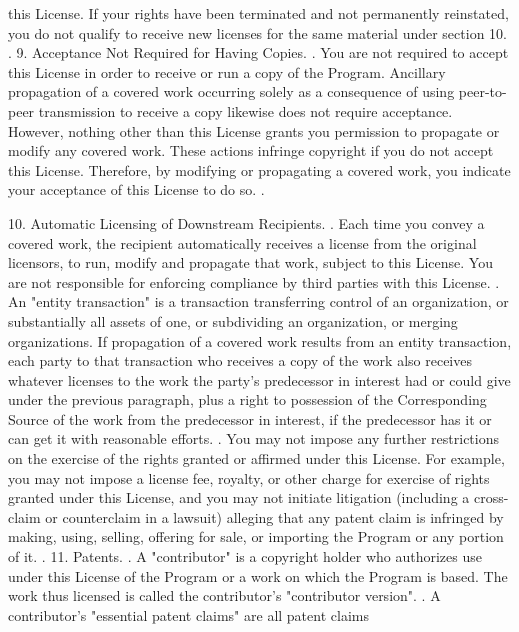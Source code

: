 \begin{script}
 this License.  If your rights have been terminated and not permanently
 reinstated, you do not qualify to receive new licenses for the same
 material under section 10.
 .
   9. Acceptance Not Required for Having Copies.
 .
   You are not required to accept this License in order to receive or
 run a copy of the Program.  Ancillary propagation of a covered work
 occurring solely as a consequence of using peer-to-peer transmission
 to receive a copy likewise does not require acceptance.  However,
 nothing other than this License grants you permission to propagate or
 modify any covered work.  These actions infringe copyright if you do
 not accept this License.  Therefore, by modifying or propagating a
 covered work, you indicate your acceptance of this License to do so.
 .
\end{script}
\begin{script}
   10. Automatic Licensing of Downstream Recipients.
 .
   Each time you convey a covered work, the recipient automatically
 receives a license from the original licensors, to run, modify and
 propagate that work, subject to this License.  You are not responsible
 for enforcing compliance by third parties with this License.
 .
   An "entity transaction" is a transaction transferring control of an
 organization, or substantially all assets of one, or subdividing an
 organization, or merging organizations.  If propagation of a covered
 work results from an entity transaction, each party to that
 transaction who receives a copy of the work also receives whatever
 licenses to the work the party's predecessor in interest had or could
 give under the previous paragraph, plus a right to possession of the
 Corresponding Source of the work from the predecessor in interest, if
 the predecessor has it or can get it with reasonable efforts.
 .
   You may not impose any further restrictions on the exercise of the
 rights granted or affirmed under this License.  For example, you may
 not impose a license fee, royalty, or other charge for exercise of
 rights granted under this License, and you may not initiate litigation
 (including a cross-claim or counterclaim in a lawsuit) alleging that
 any patent claim is infringed by making, using, selling, offering for
 sale, or importing the Program or any portion of it.
 .
   11. Patents.
 .
   A "contributor" is a copyright holder who authorizes use under this
 License of the Program or a work on which the Program is based.  The
 work thus licensed is called the contributor's "contributor version".
 .
   A contributor's "essential patent claims" are all patent claims

\end{script}
